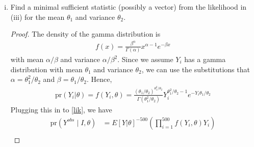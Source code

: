 \documentclass[letterpaper, 12pt]{article}
\newcommand{\pr}{\text{pr}}
\newcommand{\var}{\text{var}}
\newcommand{\sbs}{\;|\;} %
\begin{document}
\begin{enumerate}[(i)]
\begin{proof}
To answer this question, let $n_1 = 1$ from problem (ii).
Let $\theta = (\theta_1, \theta_2)$ be a multivariate parameter upon which the distribution of $Y$ depends.
Then \eqref{lik} becomes
\begin{align}
\pr(Y_i \sbs I_i =1, \theta, \alpha) 
= 
E[Y_i|\theta] ^{-1}
f(Y_i, \theta) Y_i
\label{gam}
\end{align}
So the expectation of \eqref{gam} is 
\begin{align}
E[Y_i | I_i = 1, \theta, \alpha] 
&= 
\int 
E[Y_i|\theta] ^{-1}
f(Y_i, \theta) Y_i^2 
dY_i 
\\
&= E[Y_i|\theta]^{-1} E[Y_i^2|\theta] \\
&= E[Y_i|\theta]^{-1} (\var(Y_i|\theta) + E[Y_i|\theta]^2) \\
&= \theta_1^{-1} (\theta_2 + \theta_1^2)\\
&= \frac{\theta_2}{\theta_1} + \theta_1
\end{align}
\end{proof}
\item
Find a minimal sufficient statistic (possibly a vector) from the likelihood in (iii) for the mean $\theta_1$ and variance $\theta_2$.
\begin{proof}
The density of the gamma distribution is
\begin{align}
f(x) = \frac{\beta^\alpha}{\Gamma(\alpha)} x^{\alpha - 1}e^{-\beta x}
\end{align}
with mean $\alpha / \beta$ and variance $\alpha / \beta^2$. Since we assume $Y_i$ has a gamma distribution with mean $\theta_1$ and variance $\theta_2$, we can use the substitutions that $\alpha = \theta_1^2 / \theta_2$ and $\beta = \theta_1 / \theta_2$.
Hence, 
\begin{align}
\pr(Y_i |\theta)=
f(Y_i, \theta) = \frac{(\theta_1 / \theta_2)^{\theta_1^2 / \theta_2}}{\Gamma(\theta_1^2 / \theta_2)} Y_i^{\theta_1^2 / \theta_2 - 1}e^{-Y_i \theta_1/\theta_2}
\end{align}
Plugging this in to \eqref{lik}, we have
\begin{align}
\pr(Y^{obs} \sbs I, \theta) 
&=
E[Y|\theta]^{-500}
\left(
\prod_{i=1}^{500}
f(Y_i,\theta) Y_i
\right)
\\

\end{align}
\end{proof}
\end{enumerate}
\end{document}
